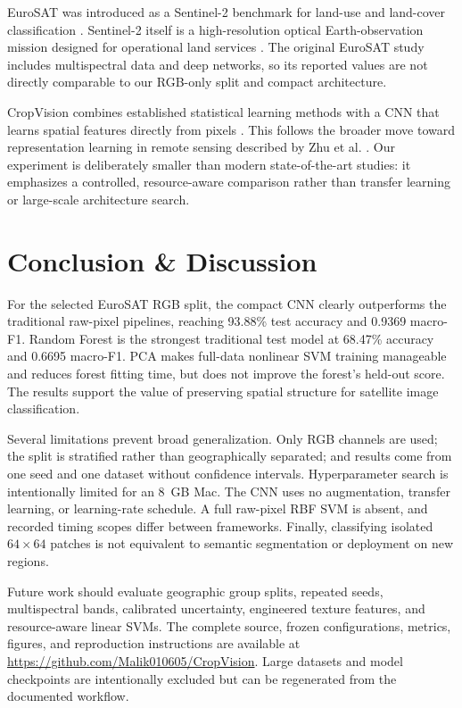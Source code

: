 \documentclass[conference]{IEEEtran}
\begin{document}
EuroSAT was introduced as a Sentinel-2 benchmark for land-use and land-cover
classification \cite{helber2019}. Sentinel-2 itself is a high-resolution
optical Earth-observation mission designed for operational land services
\cite{drusch2012}. The original EuroSAT study includes multispectral data and
deep networks, so its reported values are not directly comparable to our
RGB-only split and compact architecture.

CropVision combines established statistical learning methods
\cite{breiman2001,cortes1995,pearson1901} with a CNN that learns spatial
features directly from pixels \cite{lecun1998}. This follows the broader move
toward representation learning in remote sensing described by Zhu et al.
\cite{zhu2017}. Our experiment is deliberately smaller than modern
state-of-the-art studies: it emphasizes a controlled, resource-aware comparison
rather than transfer learning or large-scale architecture search.

\section{Conclusion \& Discussion}

For the selected EuroSAT RGB split, the compact CNN clearly outperforms the
traditional raw-pixel pipelines, reaching 93.88\% test accuracy and 0.9369
macro-F1. Random Forest is the strongest traditional test model at 68.47\%
accuracy and 0.6695 macro-F1. PCA makes full-data nonlinear SVM training
manageable and reduces forest fitting time, but does not improve the forest's
held-out score. The results support the value of preserving spatial structure
for satellite image classification.

Several limitations prevent broad generalization. Only RGB channels are used;
the split is stratified rather than geographically separated; and results come
from one seed and one dataset without confidence intervals. Hyperparameter
search is intentionally limited for an 8~GB Mac. The CNN uses no augmentation,
transfer learning, or learning-rate schedule. A full raw-pixel RBF SVM is
absent, and recorded timing scopes differ between frameworks. Finally,
classifying isolated $64\times64$ patches is not equivalent to semantic
segmentation or deployment on new regions.

Future work should evaluate geographic group splits, repeated seeds,
multispectral bands, calibrated uncertainty, engineered texture features, and
resource-aware linear SVMs. The complete source, frozen configurations,
metrics, figures, and reproduction instructions are available at
\url{https://github.com/Malik010605/CropVision}. Large datasets and model
checkpoints are intentionally excluded but can be regenerated from the
documented workflow.
\end{document}
